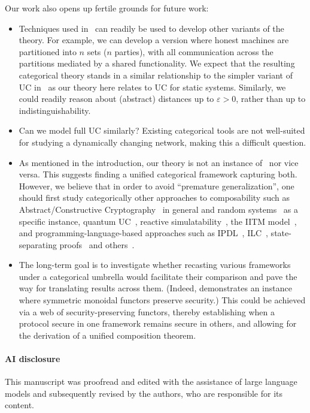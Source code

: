 Our work also opens up fertile grounds for future work:
\begin{itemize}
\item Techniques used in~\cite{BK23} can readily be used to develop other variants of the theory. For example, we can develop a version where honest machines are partitioned into $n$ sets ($n$ parties), with all communication across the partitions mediated by a shared functionality. We expect that the resulting categorical theory stands in a similar relationship to the simpler variant of UC in~\cite{DBLP:conf/crypto/CanettiCL15} as our theory here relates to UC for static systems. Similarly, we could readily reason about (abstract) distances up to $\varepsilon>0$, rather than up to indistinguishability. 

\item Can we model full UC similarly? Existing categorical tools are not well-suited for studying a dynamically changing network, making this a difficult question. 
  
\item As mentioned in the introduction, our theory is not an instance of~\cite{BK23} nor vice versa. This suggests  finding a unified categorical framework capturing both. However, we believe that in order to  avoid ``premature generalization'', one should first study categorically other approaches to composability such as
Abstract/Constructive Cryptography~\cite{MR11,Mau11} in general and random systems~\cite{M02} as a specific instance, quantum UC~\cite{Unr10}, reactive simulatability~\cite{PW01,BPW04,BPW07}, the IITM model~\cite{KTR20}, and programming-language-based approaches such as IPDL~\cite{DBLP:journals/pacmpl/GancherSFSM23}, ILC~\cite{LHM19}, state-separating proofs~\cite{BDF+18} and others~\cite{MT13,HS15}. 

\item The long-term goal is to investigate whether recasting various frameworks under a categorical umbrella would facilitate their comparison and pave the way for translating results across them. (Indeed, \cite[Theorem~4.10]{BK23} demonstrates an instance where symmetric monoidal functors preserve security.) This could be achieved via a web of security-preserving functors, thereby establishing when a protocol secure in one framework remains secure in others, and allowing for the derivation of a unified composition theorem.

\end{itemize}
\paragraph*{AI disclosure} This manuscript was proofread and edited with the assistance of large language models and subsequently revised by the authors, who are responsible for its content.






